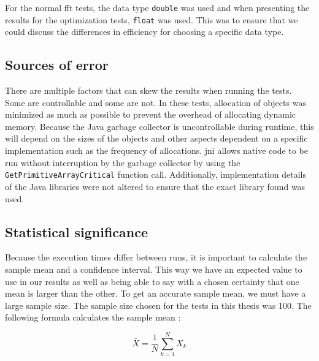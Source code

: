 For the normal \gls{fft} tests, the data type \texttt{double} was used and when presenting the results for the optimization tests, \texttt{float} was used. This was to ensure that we could discuss the differences in efficiency for choosing a specific data type.

\subsection{Sources of error}
There are multiple factors that can skew the results when running the tests. Some are controllable and some are not. In these tests, allocation of objects was minimized as much as possible to prevent the overhead of allocating dynamic memory. Because the Java garbage collector is uncontrollable during runtime, this will depend on the sizes of the objects and other aspects dependent on a specific implementation such as the frequency of allocations. \gls{jni} allows native code to be run without interruption by the garbage collector by using the \texttt{GetPrimitiveArrayCritical} function call. Additionally, implementation details of the Java libraries were not altered to ensure that the exact library found was used.


\subsection{Statistical significance}
Because the execution times differ between runs, it is important to calculate the sample mean and a confidence interval. This way we have an expected value to use in our results as well as being able to say with a chosen certainty that one mean is larger than the other. To get an accurate sample mean, we must have a large sample size. The sample size chosen for the tests in this thesis was 100. The following formula calculates the sample mean \cite[p.263]{olofsson2012probability}:

\begin{equation*}
    \bar{X} = \frac{1}{N} \sum\limits_{k = 1}^{N} X_k
\end{equation*}

